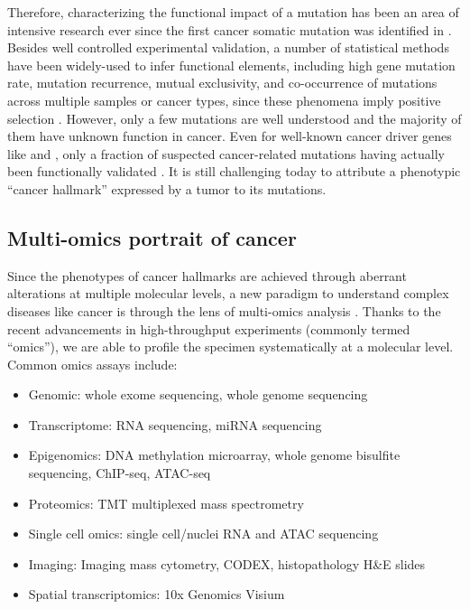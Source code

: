 Therefore, characterizing the functional impact of a mutation has been an area of intensive research ever since the first cancer somatic mutation was identified in \citeyear{reddyep_barbacidm:PointMutation1982} \cite{reddyep_barbacidm:PointMutation1982,tabincj_changeh:MechanismActivation1982}. Besides well controlled experimental validation, a number of statistical methods have been widely-used to infer functional elements, including high gene mutation rate, mutation recurrence, mutual exclusivity, and co-occurrence of mutations across multiple samples or cancer types, since these phenomena imply positive selection \cite{martincorenai_campbellpj:SomaticMutation2015}. However, only a few mutations are well understood and the majority of them have unknown function in cancer. Even for well-known cancer driver genes like  and , only a fraction of suspected cancer-related mutations having actually been functionally validated \cite{ngpks_millsgb:SystematicFunctional2018}. It is still challenging today to attribute a phenotypic ``cancer hallmark'' expressed by a tumor to its mutations.


\subsection{Multi-omics portrait of cancer}
Since the phenotypes of cancer hallmarks are achieved through aberrant alterations at multiple molecular levels, a new paradigm to understand complex diseases like cancer is through the lens of multi-omics analysis \cite{deanda-jaureguig_hernandez-lemuse:ComputationalOncology2020}. Thanks to the recent advancements in high-throughput experiments (commonly termed ``omics''), we are able to profile the specimen systematically at a molecular level. Common omics assays include:

\begin{itemize}
    \item Genomic: whole exome sequencing, whole genome sequencing
    \item Transcriptome: RNA sequencing, miRNA sequencing
    \item Epigenomics: DNA methylation microarray, whole genome bisulfite sequencing, ChIP-seq, ATAC-seq
    \item Proteomics: TMT multiplexed mass spectrometry
    \item Single cell omics: single cell/nuclei RNA and ATAC sequencing
    \item Imaging: Imaging mass cytometry, CODEX, histopathology H\&E slides
    \item Spatial transcriptomics: 10x Genomics Visium
\end{itemize}

